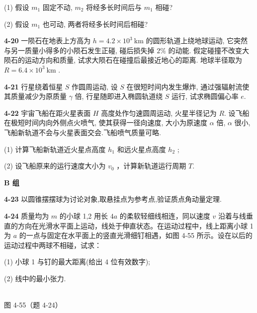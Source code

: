 (1) 假设 $m_{1}$ 固定不动, $m_{2}$ 将经多长时间后与 $m_{1}$ 相碰?

(2) 假设 $m_{1}$ 也可动, 两者将经多长时间后相碰?

\newpage

\textbf{4-20} 一陨石在地表上方高为 $h = 4.2 \times 10^{3} \mathrm{~km}$ 的圆形轨道上绕地球运动, 它突然与另一质量小得多的小陨石发生正碰, 碰后损失掉 $2\%$ 的动能. 假定碰撞不改变大陨石的运动方向和质量, 试求大陨石在碰撞后最接近地心的距离. 地球半径取为 $R = 6.4 \times 10^{3} \mathrm{~km}$ .

\newpage

\textbf{4-21} 行星绕着恒星 $S$ 作圆周运动, 设 $S$ 在很短时间内发生爆炸, 通过强辐射流使其质量减少为原质量 $\gamma$ 倍, 行星随即进入椭圆轨道绕 $S$ 运行, 试求椭圆偏心率 $e$.

\newpage

\textbf{4-22} 宇宙飞船在距火星表面 $H$ 高度处作匀速圆周运动, 火星半径记为 $R$. 设飞船在极短时间内向外侧点火喷气, 使其获得一径向速度, 大小为原速度 $\alpha$ 倍, $\alpha$ 很小, 飞船新轨道不会与火星表面交会.飞船喷气质量可略.

(1) 计算飞船新轨道近火星点高度 $h_{1}$ 和远火星点高度 $h_{2}$ ;

(2) 设飞船原来的运行速度大小为 $v_{0}$ ，计算新轨道运行周期 $T$.

\newpage

\begin{center}\textbf{B 组}\end{center}

\textbf{4-23} 以圆锥摆摆球为讨论对象,取悬挂点为参考点,验证质点角动量定理.

\newpage

\textbf{4-24} 质量均为 $m$ 的小球 1,2 用长 $4a$ 的柔软轻细线相连，同以速度 $v$ 沿着与线垂直的方向在光滑水平面上运动，线处于伸直状态。在运动过程中，线上距离小球 1 为 $a$ 的一点与固定在水平面上的竖直光滑细钉相遇，如图 4-55 所示。设在以后的运动过程中两球不相碰，试求：

(1) 小球 1 与钉的最大距离(给出 4 位有效数字);

(2) 线中的最小张力.

\begin{center}
\resizebox{0.46\textwidth}{!}{}\\[4pt]
{\small 图 4-55（题 4-24）}
\end{center}

